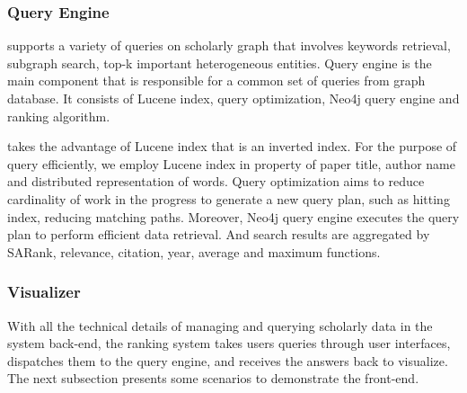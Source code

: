 

\subsubsection{Query Engine}
\oursystem supports a variety of queries on scholarly graph that involves keywords retrieval, subgraph search, top-k important heterogeneous entities. Query engine is the main component that is responsible for a common set of queries from graph database. It consists of Lucene index, query optimization, Neo4j query engine and ranking algorithm. 

\par 
\oursystem takes the advantage of Lucene index that is an inverted index. For the purpose of query efficiently, we employ Lucene index in property of paper title, author name and distributed representation of words. Query optimization aims to reduce cardinality of work in the progress to generate a new query plan, such as hitting index, reducing matching paths. Moreover, Neo4j query engine executes the query plan to perform efficient data retrieval. And search results are aggregated by SARank, relevance, citation, year, average and maximum functions.

\subsubsection{Visualizer}
With all the technical details of managing and querying scholarly data in the system back-end, the ranking system takes users queries through user interfaces, dispatches them to the query engine, and receives the answers back to visualize. The next subsection presents some scenarios to demonstrate the front-end.

